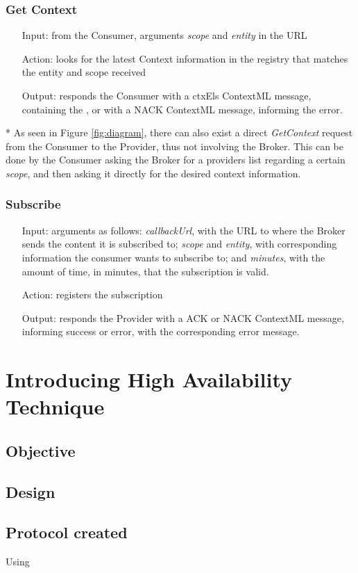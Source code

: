 \subsubsection{Get Context}
\begin{itemize}
	\item[Input:] from the Consumer, arguments \textit{scope} and \textit{entity} in the URL
	
	\item[Action:] looks for the latest Context information in the registry that matches the entity and scope received
	
	\item[Output:] responds the Consumer with a ctxEls ContextML message, containing the , or with a NACK ContextML message, informing the error.
	
\end{itemize}
* As seen in Figure \ref{fig:diagram}, there can also exist a direct \textit{GetContext} request from the Consumer to the Provider, thus not involving the Broker. This can be done by the Consumer asking the Broker for a providers list regarding a certain \textit{scope}, and then asking it directly for the desired context information. 

\subsubsection{Subscribe}
\begin{itemize}
	\item[Input:] arguments as follows:  \textit{callbackUrl}, with the URL to where the Broker sends the content it is subscribed to; \textit{scope} and \textit{entity}, with corresponding information the consumer wants to subscribe to; and \textit{minutes}, with the amount of time, in minutes, that the subscription is valid.
	
	\item[Action:] registers the subscription
	
	\item[Output:] responds the Provider with a ACK or NACK ContextML message, informing success or error, with the corresponding error message.
\end{itemize}

\section{Introducing High Availability Technique}
\label{sec:ha_broker}

\subsection{Objective}

\subsection{Design}

\subsection{Protocol created}
Using \cite{protobuf}